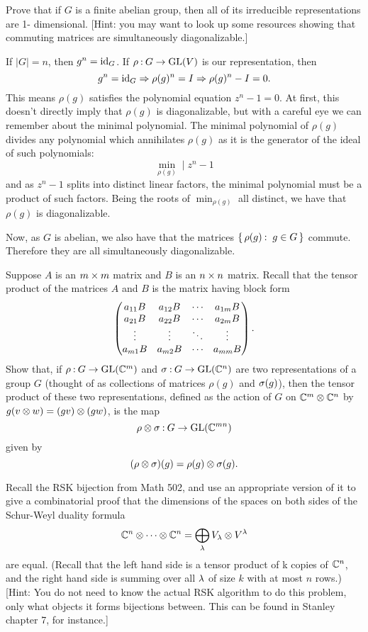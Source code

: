 \documentclass[12pt]{memoir}
\begin{document}
\begin{Ej}
    Prove that if $G$ is a ﬁnite abelian group, then all of its irreducible representations are 1-
dimensional. [Hint: you may want to look up some resources showing that commuting matrices are
simultaneously diagonalizable.]
\end{Ej}

\begin{ptcbr}
If $|G|=n$, then $g^n=\operatorname{id}_G$. If $\rho\mathbin{:}G\to\mathrm{GL}(V)$ is our representation, then 
$$g^n=\operatorname{id}_G\Rightarrow\rho(g)^n=I\Rightarrow\rho(g)^n-I=0.$$
This means $\rho(g)$ satisfies the polynomial equation $z^n-1=0$. At first, this doesn't directly imply that $\rho(g)$ is diagonalizable, but with a careful eye we can remember about the minimal polynomial. The minimal polynomial of $\rho(g)$ divides any polynomial which annihilates $\rho(g)$ as it is the generator of the ideal of such polynomials:
$$\min_{\rho(g)}\mid z^n-1$$
and as $z^n-1$ splits into distinct linear factors, the minimal polynomial must be a product of such factors. Being the roots of $\min_{\rho(g)}$ all distinct, we have that $\rho(g)$ is diagonalizable.\par 
Now, as $G$ is abelian, we also have that the matrices $\{\,\rho(g)\mathbin{:}\ g\in G\,\}$ commute. Therefore they are all simultaneously diagonalizable.
\end{ptcbr}

\begin{Ej}
    Suppose $A$ is an $m\times m$ matrix and $B$ is an $n\times n$ matrix. Recall that the tensor product of the matrices $A$ and $B$ is the matrix having block form
    $$\begin{pmatrix} a_{11}B & a_{12}B & \cdots & a_{1m}B\\ a_{21}B & a_{22}B & \cdots & a_{2m}B \\ \vdots & \vdots & \ddots & \vdots \\ a_{m1}B & a_{m2}B & \cdots & a_{mm}B \end{pmatrix}.$$
    Show that, if $\rho\mathbin{:} G\to\mathrm{GL}(\mathbb{C}^m)$ and $\sigma\mathbin{:} G\to\mathrm{GL}(\mathbb{C}^n)$ are two representations of a group $G$ (thought of
as collections of matrices $\rho(g)$ and $\sigma(g)$), then the tensor product of these two representations, deﬁned
as the action of $G$ on $\mathbb{C}^m\otimes\mathbb{C}^n$ by $g(v\otimes w)=(gv)\otimes(gw)$, is the map
$$\rho\otimes\sigma\mathbin{:} G\to\mathrm{GL}(\mathbb{C}^{mn})$$
given by 
$$(\rho\otimes\sigma)(g)=\rho(g)\otimes\sigma(g).$$
\end{Ej}

\begin{Ej}
    Recall the RSK bijection from Math 502, and use an appropriate version of it to give a combinatorial proof that the dimensions of the spaces on both sides of the Schur-Weyl duality formula
    $$\mathbb{C}^n\otimes\cdots\otimes\mathbb{C}^n=\bigoplus_\lambda V_\lambda\otimes V^\lambda$$
    are equal. (Recall that the left hand side is a tensor product of k copies of $\mathbb{C}^n$, and the right hand side
    is summing over all $\lambda$ of size $k$ with at most $n$ rows.)
    [Hint: You do not need to know the actual RSK algorithm to do this problem, only what objects it
    forms bijections between. This can be found in Stanley chapter 7, for instance.]
\end{Ej}
\end{document}
